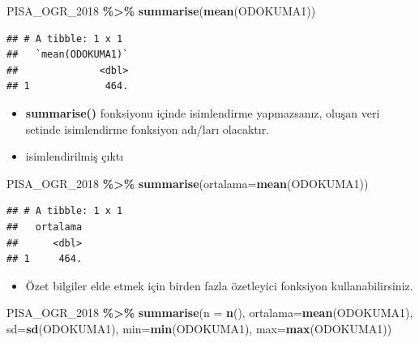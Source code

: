\documentclass[
  oneside]{book}
\newenvironment{Shaded}{\begin{snugshade}}{\end{snugshade}}
\newcommand{\AttributeTok}[1]{\textcolor[rgb]{0.13,0.29,0.53}{#1}}
\newcommand{\FunctionTok}[1]{\textcolor[rgb]{0.13,0.29,0.53}{\textbf{#1}}}
\newcommand{\NormalTok}[1]{#1}
\newcommand{\SpecialCharTok}[1]{\textcolor[rgb]{0.81,0.36,0.00}{\textbf{#1}}}
\providecommand{\tightlist}{%
  \setlength{\itemsep}{0pt}\setlength{\parskip}{0pt}}
\begin{document}
\begin{Shaded}
\begin{Highlighting}[]
\NormalTok{PISA\_OGR\_2018 }\SpecialCharTok{\%\textgreater{}\%} 
\FunctionTok{summarise}\NormalTok{(}\FunctionTok{mean}\NormalTok{(ODOKUMA1))}
\end{Highlighting}
\end{Shaded}

\begin{verbatim}
## # A tibble: 1 x 1
##   `mean(ODOKUMA1)`
##              <dbl>
## 1             464.
\end{verbatim}

\begin{itemize}
\item
  \textbf{summarise()} fonksiyonu içinde isimlendirme yapmazsanız, oluşan veri setinde isimlendirme fonksiyon adı/ları olacaktır.
\item
  isimlendirilmiş çıktı
\end{itemize}

\begin{Shaded}
\begin{Highlighting}[]
\NormalTok{PISA\_OGR\_2018 }\SpecialCharTok{\%\textgreater{}\%}
  \FunctionTok{summarise}\NormalTok{(}\AttributeTok{ortalama=}\FunctionTok{mean}\NormalTok{(ODOKUMA1))}
\end{Highlighting}
\end{Shaded}

\begin{verbatim}
## # A tibble: 1 x 1
##   ortalama
##      <dbl>
## 1     464.
\end{verbatim}

\begin{itemize}
\tightlist
\item
  Özet bilgiler elde etmek için birden fazla özetleyici fonksiyon kullanabilirsiniz.
\end{itemize}

\begin{Shaded}
\begin{Highlighting}[]
\NormalTok{PISA\_OGR\_2018 }\SpecialCharTok{\%\textgreater{}\%}
  \FunctionTok{summarise}\NormalTok{(}\AttributeTok{n =} \FunctionTok{n}\NormalTok{(),}
            \AttributeTok{ortalama=}\FunctionTok{mean}\NormalTok{(ODOKUMA1),}
            \AttributeTok{sd=}\FunctionTok{sd}\NormalTok{(ODOKUMA1),}
            \AttributeTok{min=}\FunctionTok{min}\NormalTok{(ODOKUMA1),}
            \AttributeTok{max=}\FunctionTok{max}\NormalTok{(ODOKUMA1))}
\end{Highlighting}
\end{Shaded}
\end{document}
